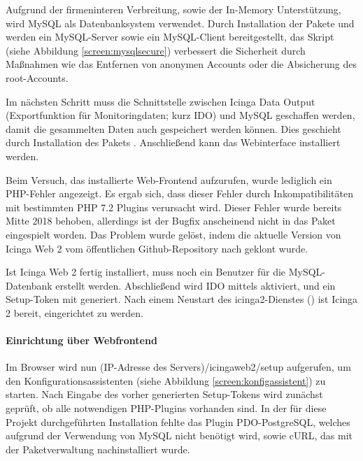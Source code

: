 Aufgrund der firmeninteren Verbreitung, sowie der In-Memory Unterstützung, wird MySQL als Datenbanksystem verwendet. Durch Installation der Pakete  und  werden ein MySQL-Server sowie ein MySQL-Client bereitgestellt, das Skript  (siehe Abbildung \ref{screen:mysqlsecure}) verbessert die Sicherheit durch Maßnahmen wie das Entfernen von anonymen Accounts oder die Absicherung des root-Accounts.

Im nächsten Schritt muss die Schnittstelle zwischen \glqq{}Icinga Data Output\grqq{} (Exportfunktion für Monitoringdaten; kurz IDO) und MySQL geschaffen werden, damit die gesammelten Daten auch gespeichert werden können. Dies geschieht durch Installation des Pakets . Anschließend kann das Webinterface  installiert werden.

Beim Versuch, das installierte Web-Frontend aufzurufen, wurde lediglich ein PHP-Fehler angezeigt. Es ergab sich, dass dieser Fehler durch Inkompatibilitäten mit bestimmten PHP 7.2 Plugins verursacht wird. Dieser Fehler wurde bereits Mitte 2018 behoben, allerdings ist der Bugfix anscheinend nicht in das Paket eingespielt worden. Das Problem wurde gelöst, indem die aktuelle Version von \glqq{}Icinga Web 2\grqq{} vom öffentlichen Github-Repository nach  geklont wurde.

Ist \glqq{}Icinga Web 2\grqq{} fertig installiert, muss noch ein Benutzer für die MySQL-Datenbank erstellt werden. Abschließend wird IDO mittels  aktiviert, und ein Setup-Token mit  generiert. Nach einem Neustart des icinga2-Dienstes () ist \glqq{}Icinga 2\grqq{} bereit, eingerichtet zu werden.

\paragraph{Einrichtung über Webfrontend}
Im Browser wird nun (IP-Adresse des Servers)/icingaweb2/setup aufgerufen, um den Konfigurationsassistenten (siehe Abbildung \ref{screen:konfigassistent}) zu starten. Nach Eingabe des vorher generierten Setup-Tokens wird zunächst geprüft, ob alle notwendigen PHP-Plugins vorhanden sind. In der für diese Projekt durchgeführten Installation fehlte das Plugin \glqq{}PDO-PostgreSQL\grqq{}, welches aufgrund der Verwendung von MySQL nicht benötigt wird, sowie \glqq{}cURL\grqq{}, das mit der Paketverwaltung nachinstalliert wurde.

